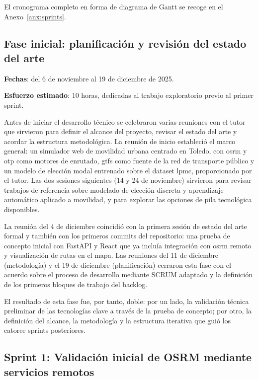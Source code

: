 El cronograma completo en forma de diagrama de Gantt se recoge en el Anexo~\ref{anx:sprints}.

\subsection{Fase inicial: planificación y revisión del estado del arte}

\textbf{Fechas}: del 6 de noviembre al 19 de diciembre de 2025.

\textbf{Esfuerzo estimado}: 10 horas, dedicadas al trabajo exploratorio previo al primer sprint.\newline

Antes de iniciar el desarrollo técnico se celebraron varias reuniones con el tutor que sirvieron para definir el alcance del proyecto, revisar el estado del arte y acordar la estructura metodológica. La reunión de inicio estableció el marco general: un simulador web de movilidad urbana centrado en Toledo, con \gls{osrm} y \gls{otp} como motores de enrutado, \gls{gtfs} como fuente de la red de transporte público y un modelo de elección modal entrenado sobre el dataset \gls{lpmc}, proporcionado por el tutor. Las dos sesiones siguientes (14 y 24 de noviembre) sirvieron para revisar trabajos de referencia sobre modelado de elección discreta y aprendizaje automático aplicado a movilidad, y para explorar las opciones de pila tecnológica disponibles.\newline

La reunión del 4 de diciembre coincidió con la primera sesión de estado del arte formal y también con los primeros commits del repositorio: una prueba de concepto inicial con FastAPI y React que ya incluía integración con \gls{osrm} remoto y visualización de rutas en el mapa. Las reuniones del 11 de diciembre (metodología) y el 19 de diciembre (planificación) cerraron esta fase con el acuerdo sobre el proceso de desarrollo mediante SCRUM adaptado y la definición de los primeros bloques de trabajo del backlog.\newline

El resultado de esta fase fue, por tanto, doble: por un lado, la validación técnica preliminar de las tecnologías clave a través de la prueba de concepto; por otro, la definición del alcance, la metodología y la estructura iterativa que guió los catorce sprints posteriores.

\subsection{Sprint 1: Validación inicial de OSRM mediante servicios remotos}

